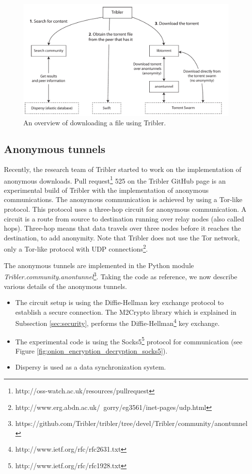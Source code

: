 		\begin{figure}[!htb]
			\centering
			\includegraphics[width=\textwidth]{graphics/tribler-overview.pdf}
			\caption{An overview of downloading a file using Tribler.}
			\label{fig:tribleroverview}
		\end{figure}
	
	\subsection{Anonymous tunnels}
		\label{sec:anonymoustunnels}
			Recently, the research team of Tribler started to work on the implementation of anonymous downloads. Pull request\footnote{http://oss-watch.ac.uk/resources/pullrequest} 525 on the Tribler GitHub page \cite{pullrequest525} is an experimental build of Tribler with the implementation of anonymous communications. The anonymous communication is achieved by using a Tor-like protocol. This protocol uses a three-hop circuit for anonymous communication. A circuit is a route from source to destination running over relay nodes (also called hops). Three-hop means that data travels over three nodes before it reaches the destination, to add anonymity. Note that Tribler does not use the Tor network, only a Tor-like protocol with UDP connections\footnote{http://www.erg.abdn.ac.uk/~gorry/eg3561/inet-pages/udp.html}.
			
			The anonymous tunnels are implemented in the Python module \emph{Tribler.community.anontunnel}\footnote{https://github.com/Tribler/tribler/tree/devel/Tribler/community/anontunnel}. Taking the code as reference, we now describe various details of the anonymous tunnels.
			
			\begin{itemize} 
				\item The circuit setup is using the Diffie-Hellman key exchange protocol to establish a secure connection. The M2Crypto library which is explained in Subsection \ref{sec:security}, performs the Diffie-Hellman\footnote{http://www.ietf.org/rfc/rfc2631.txt} key exchange.
				\item The experimental code is using the Socks5\footnote{http://www.ietf.org/rfc/rfc1928.txt} protocol for communication (see Figure \ref{fig:onion_encryption_decryption_socks5}).
				\item Dispersy is used as a data synchronization system. 
			\end{itemize}
			
